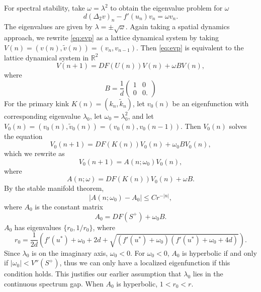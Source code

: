 \documentclass[12pt,reqno]{amsart}
\def\R{{\mathbb R}}
\begin{document}
For spectral stability, take $\omega = \lambda^2$ to obtain the eigenvalue problem for $\omega$
\begin{equation}\label{eq:evp}
d (\Delta_2 v)_n - f'(u_n)v_n = \omega v_n.
\end{equation}
The eigenvalues are given by $\lambda = \pm \sqrt{\omega}$. Again taking a spatial dynamics approach, we rewrite \cref{eq:evp} as a lattice dynamical system by taking $V(n) = (v(n), \tilde{v}(n)) = (v_n, v_{n-1})$. Then \cref{eq:evp} is equivalent to the lattice dynamical system in $\R^2$
\begin{equation}\label{eq:EVPdyneq}
V(n+1) = D F( U(n) )V(n) + \omega B V(n),
\end{equation}
where
\[
B = \frac{1}{d}
\begin{pmatrix}1 & 0 \\ 0 & 0.
\end{pmatrix}
\] 
For the primary kink $K(n) = (k_n, \tilde{k}_n)$, let $v_0(n)$ be an eigenfunction with corresponding eigenvalue $\lambda_0$, let $\omega_0 = \lambda_0^2$, and let $V_0(n) = (v_0(n), \tilde{v}_0(n)) = (v_0(n), v_0(n-1))$. Then $V_0(n)$ solves the equation
\begin{equation}\label{eq:V0eq}
V_0(n+1) = D F( K(n) )V_0(n) + \omega_0 B V_0(n),
\end{equation}
which we rewrite as
\begin{equation}\label{eq:V0Aeq}
	V_0(n+1) = A(n; \omega_0) V_0(n),
\end{equation}
where
\begin{equation}\label{eq:Aomegaeq}
	A(n; \omega) = D F( K(n) )V_0(n) + \omega B.
\end{equation}
By the stable manifold theorem, 
\begin{equation}\label{eq:A0decay}
	|A(n; \omega_0) - A_0| \leq C r^{-|n|},
\end{equation}
where $A_0$ is the constant matrix
\begin{equation}
	A_0 = DF(S^+) + \omega_0 B.
\end{equation}
$A_0$ has eigenvalues $\{ r_0, 1/r_0 \}$, where
\begin{equation}\label{eq:r0}
r_0 = \frac{1}{2d}\left( f'(u^*) + \omega_0 + 2d + \sqrt{(f'(u^*)+ \omega_0)(f'(u^*) + \omega_0 + 4d)} \right).
\end{equation}
Since $\lambda_0$ is on the imaginary axis, $\omega_0 < 0$. For $\omega_0 < 0$, $A_0$ is hyperbolic if and only if $|\omega_0| < V''(S^+)$, thus we can only have a localized eigenfunction if this condition holds. This justifies our earlier assumption that $\lambda_0$ lies in the continuous spectrum gap. When $A_0$ is hyperbolic, $1 < r_0 < r$. 
\end{document}
